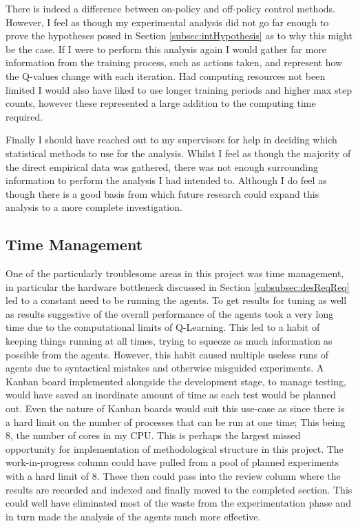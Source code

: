 \documentclass[hidelinks,journal]{IEEEtran}
\begin{document}
There is indeed a difference between on-policy and off-policy control methods. However, I feel as though my experimental analysis did not go far enough to prove the hypotheses posed in Section \ref{subsec:intHypothesis} as to why this might be the case. If I were to perform this analysis again I would gather far more information from the training process, such as actions taken, and represent how the Q-values change with each iteration. Had computing resources not been limited I would also have liked to use longer training periods and higher max step counts, however these represented a large addition to the computing time required.

Finally I should have reached out to my supervisors for help in deciding which  statistical methods to use for the analysis. Whilst I feel as though the majority of the direct empirical data was gathered, there was not enough surrounding information to perform the analysis I had intended to. Although I do feel as though there is a good basis from which future research could expand this analysis to a more complete investigation.
\subsection{Time Management}
\label{subsec:dissTime}
One of the particularly troublesome areas in this project was time management, in particular the hardware bottleneck discussed in Section \ref{subsubsec:desReqReq} led to a constant need to be running the agents. To get results for tuning as well as results suggestive of the overall performance of the agents took a very long time due to the computational limits of Q-Learning. This led to a habit of keeping things running at all times, trying to squeeze as much information as possible from the agents. However, this habit caused multiple useless runs of agents due to syntactical mistakes and otherwise misguided experiments. A Kanban board implemented alongside the development stage, to manage testing, would have saved an inordinate amount of time as each test would be planned out. Even the nature of Kanban boards would suit this use-case as since there is a hard limit on the number of processes that can be run at one time; This being 8, the number of cores in my CPU. This is perhaps the largest missed opportunity for implementation of methodological structure in this project. The work-in-progress column could have pulled from a pool of planned experiments with a hard limit of 8. These then could pass into the review column where the results are recorded and indexed and finally moved to the completed section. This could well have eliminated most of the waste from the experimentation phase and in turn made the analysis of the agents much more effective.
\end{document}
